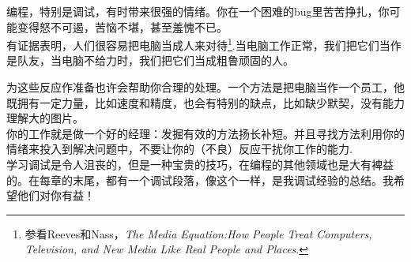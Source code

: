 编程，特别是调试，有时带来很强的情绪。你在一个困难的bug里苦苦挣扎，你可能变得怒不可遏，苦恼不堪，甚至羞愧不已。\\

有证据表明，人们很容易把电脑当成人来对待\footnote{参看Reeves和Nass，{\it The Media Equation:How People Treat Computers, Television, and New Media Like Real People and Places}.}.当电脑工作正常，我们把它们当作是队友，当电脑不给力时，我们把它们当成粗鲁顽固的人。\\


为这些反应作准备也许会帮助你合理的处理。一个方法是把电脑当作一个员工，他既拥有一定力量，比如速度和精度，也会有特别的缺点，比如缺少默契，没有能力理解大的图片。\\

你的工作就是做一个好的经理：发掘有效的方法扬长补短。并且寻找方法利用你的情绪来投入到解决问题中，不要让你的（不良）反应干扰你工作的能力.\\

学习调试是令人沮丧的，但是一种宝贵的技巧，在编程的其他领域也是大有裨益的。在每章的末尾，都有一个调试段落，像这个一样，是我调试经验的总结。我希望他们对你有益！

